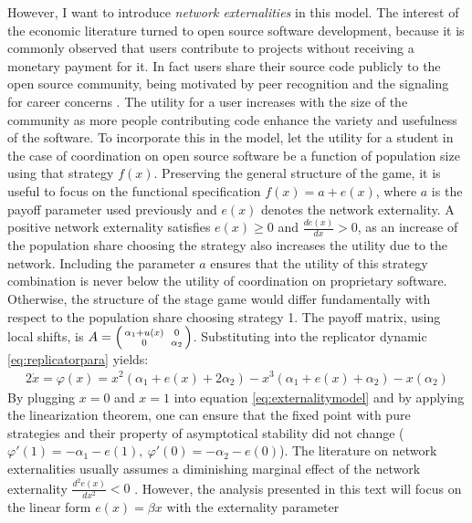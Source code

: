 However, I want to introduce \textit{network externalities} in this model. 
The interest of the economic literature turned to open source software 
development, because it is commonly observed that users contribute to 
projects without receiving a monetary payment for it.
In fact users share their source code publicly to the open source community,
being motivated by peer recognition and the signaling for career concerns
\parencite[21]{lerner_simple_2002}.
The utility for a user increases with the size of the community as 
more people contributing code enhance the variety and usefulness of the 
software. 
To incorporate this in the model, let the utility for a student 
in the case of coordination on open source software be a function of 
population size using that strategy $f(x)$. 
Preserving the general structure of the
game, it is useful to focus on the functional specification 
$f(x) = a + e(x)$, where $a$ is the payoff parameter used 
previously and $e(x)$ denotes the network externality. 
A positive network externality satisfies $e(x)\geq 0$ and 
$\frac{de(x)}{dx}>0$, 
as an increase of the population share choosing the strategy
also increases the utility due to the network. 
Including the parameter $a$ ensures that the utility of this 
strategy combination is never below the utility of coordination on 
proprietary software. Otherwise, the structure of the stage game would 
differ fundamentally with respect to the population share choosing strategy 1. 
The payoff matrix, using local shifts, is 
$A=\begin{psmallmatrix}\alpha_1+u(x) && 0 \\ 0&& \alpha_2\end{psmallmatrix}$. 
Substituting into the replicator dynamic  \ref{eq:replicatorpara} yields:
\begin{alignat}{2}
        \dot{x} = \varphi(x) = x^2(\alpha_1+e(x) +2\alpha_2 ) 
        - x^3(\alpha_1+e(x)+\alpha_2) - x(\alpha_2)
        \label{eq:externalitymodel}
\end{alignat}
By plugging $x=0$ and $x=1$ into equation \eqref{eq:externalitymodel} and 
by applying the linearization theorem, one can ensure 
that the fixed point with pure strategies and their
property of asymptotical stability did not change
($\varphi'(1) = -\alpha_1 -e(1),\ \varphi'(0) = -\alpha_2 -e(0)$).
The literature on network externalities usually assumes a diminishing
marginal effect of the network externality $\frac{d^2e(x)}{dx^2} <0$ 
\parencite[73]{lin_impact_2008}. However, the analysis presented in this text
will focus on the linear form $e(x) = \beta x$ with the externality parameter

